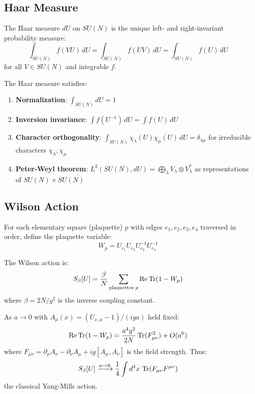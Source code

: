 \subsection{Haar Measure}

\begin{definition}
The Haar measure $dU$ on $SU(N)$ is the unique left- and right-invariant 
probability measure:
\[
\int_{SU(N)} f(VU) \, dU = \int_{SU(N)} f(UV) \, dU = \int_{SU(N)} f(U) \, dU
\]
for all $V \in SU(N)$ and integrable $f$.
\end{definition}

\begin{lemma}
\label{lem:haar-props}
The Haar measure satisfies:
\begin{enumerate}[label=(\roman*)]
\item \textbf{Normalization}: $\int_{SU(N)} dU = 1$
\item \textbf{Inversion invariance}: $\int f(U^{-1}) \, dU = \int f(U) \, dU$
\item \textbf{Character orthogonality}: 
$\int_{SU(N)} \chi_\lambda(U) \overline{\chi_\mu(U)} \, dU = \delta_{\lambda\mu}$
for irreducible characters $\chi_\lambda, \chi_\mu$
\item \textbf{Peter-Weyl theorem}: 
$L^2(SU(N), dU) = \bigoplus_\lambda V_\lambda \otimes V_\lambda^*$
as representations of $SU(N) \times SU(N)$
\end{enumerate}
\end{lemma}

\subsection{Wilson Action}

For each elementary square (plaquette) $p$ with edges $e_1, e_2, e_3, e_4$ 
traversed in order, define the plaquette variable:
\[
W_p = U_{e_1} U_{e_2} U_{e_3}^{-1} U_{e_4}^{-1}
\]

\begin{definition}
\label{def:wilson_action}
The Wilson action is:
\[
S_\beta[U] = \frac{\beta}{N} \sum_{\text{plaquettes } p} \operatorname{Re}\operatorname{Tr}(1 - W_p)
\]
where $\beta = 2N/g^2$ is the inverse coupling constant.
\end{definition}

\begin{remark}
As $a \to 0$ with $A_\mu(x) = (U_{x,\mu} - 1)/(iga)$ held fixed:
\[
\operatorname{Re}\operatorname{Tr}(1 - W_p) = \frac{a^4 g^2}{2N} \operatorname{Tr}(F_{\mu\nu}^2) + O(a^6)
\]
where $F_{\mu\nu} = \partial_\mu A_\nu - \partial_\nu A_\mu + ig[A_\mu, A_\nu]$ 
is the field strength. Thus:
\[
S_\beta[U] \xrightarrow{a \to 0} \frac{1}{4} \int d^4x \, \operatorname{Tr}(F_{\mu\nu}F^{\mu\nu})
\]
the classical Yang-Mills action.
\end{remark}

